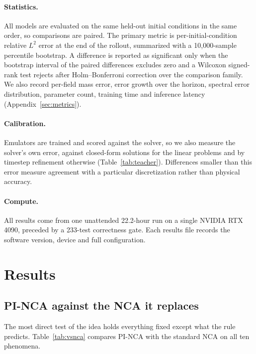 \documentclass{article}
\begin{document}
\paragraph{Statistics.} All models are evaluated on the same held-out initial conditions
in the same order, so comparisons are paired. The primary metric is per-initial-condition
relative $L^2$ error at the end of the rollout, summarized with a 10{,}000-sample
percentile bootstrap. A difference is reported as significant only when the bootstrap
interval of the paired differences excludes zero and a Wilcoxon signed-rank test rejects
after Holm--Bonferroni correction over the comparison family. We also record per-field
mass error, error growth over the horizon, spectral error distribution, parameter count,
training time and inference latency (Appendix~\ref{sec:metrics}).

\paragraph{Calibration.} Emulators are trained and scored against the solver, so we also
measure the solver's own error, against closed-form solutions for the linear problems and
by timestep refinement otherwise (Table~\ref{tab:teacher}). Differences smaller than this
error measure agreement with a particular discretization rather than physical accuracy.

\paragraph{Compute.} All results come from one unattended 22.2-hour run on a single NVIDIA
RTX 4090, preceded by a 233-test correctness gate. Each results file records the software
version, device and full configuration.

\section{Results}
\label{sec:results}

\subsection{PI-NCA against the NCA it replaces}
\label{sec:vsnca}
The most direct test of the idea holds everything fixed except what the rule predicts.
Table~\ref{tab:vsnca} compares PI-NCA with the standard NCA on all ten phenomena.


\end{document}

